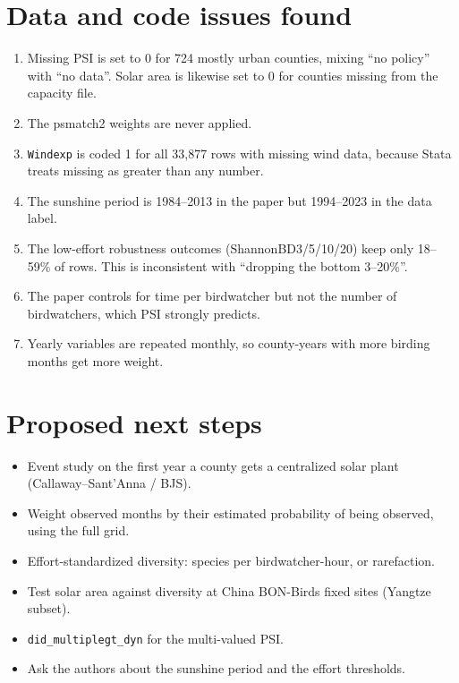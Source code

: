 \documentclass[11pt]{article}
\begin{document}
\section{Data and code issues found}
\begin{enumerate}
\item Missing PSI is set to 0 for 724 mostly urban counties, mixing ``no policy'' with ``no data''. Solar area is likewise set to 0 for counties missing from the capacity file.
\item The psmatch2 weights are never applied.
\item \texttt{Windexp} is coded 1 for all 33,877 rows with missing wind data, because Stata treats missing as greater than any number.
\item The sunshine period is 1984--2013 in the paper but 1994--2023 in the data label.
\item The low-effort robustness outcomes (ShannonBD3/5/10/20) keep only 18--59\% of rows. This is inconsistent with ``dropping the bottom 3--20\%''.
\item The paper controls for time per birdwatcher but not the number of birdwatchers, which PSI strongly predicts.
\item Yearly variables are repeated monthly, so county-years with more birding months get more weight.
\end{enumerate}

\section{Proposed next steps}
\begin{itemize}
\item Event study on the first year a county gets a centralized solar plant (Callaway--Sant'Anna / BJS).
\item Weight observed months by their estimated probability of being observed, using the full grid.
\item Effort-standardized diversity: species per birdwatcher-hour, or rarefaction.
\item Test solar area against diversity at China BON-Birds fixed sites (Yangtze subset).
\item \texttt{did\_multiplegt\_dyn} for the multi-valued PSI.
\item Ask the authors about the sunshine period and the effort thresholds.
\end{itemize}
\end{document}
